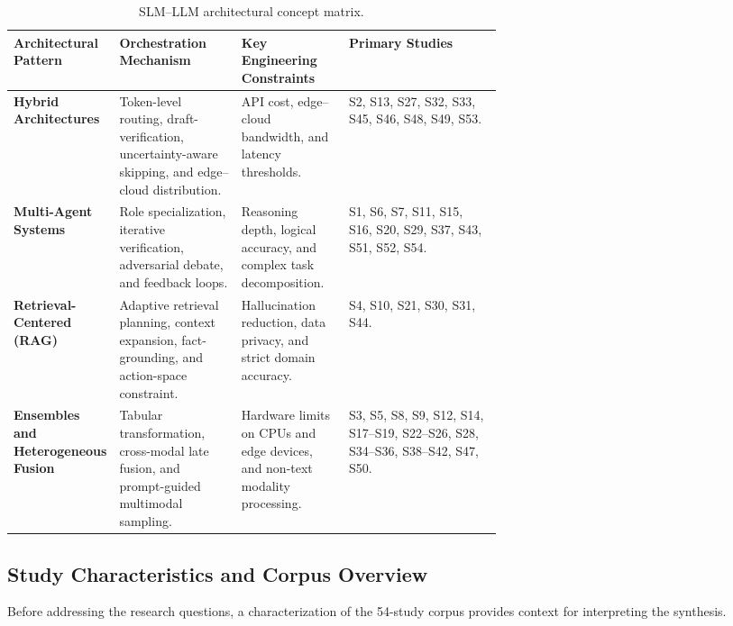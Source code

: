 \begin{table}[!htbp]
\centering
\caption{SLM--LLM architectural concept matrix.}
\label{tab:concept-matrix}
\footnotesize
\setlength{\tabcolsep}{3pt}
\renewcommand{\arraystretch}{1.08}
\begin{tabularx}{\linewidth}{
  @{}
  >{\raggedright\arraybackslash}p{0.16\linewidth}
  >{\raggedright\arraybackslash}p{0.25\linewidth}
  >{\raggedright\arraybackslash}p{0.22\linewidth}
  >{\raggedright\arraybackslash}X
  @{}
}
\toprule
\textbf{Architectural Pattern} &
\textbf{Orchestration Mechanism} &
\textbf{Key Engineering Constraints} &
\textbf{Primary Studies} \\
\midrule
\textbf{Hybrid Architectures} &
Token-level routing, draft-verification, uncertainty-aware skipping, and edge--cloud distribution. &
API cost, edge--cloud bandwidth, and latency thresholds. &
S2, S13, S27, S32, S33, S45, S46, S48, S49, S53. \\

\textbf{Multi-Agent Systems} &
Role specialization, iterative verification, adversarial debate, and feedback loops. &
Reasoning depth, logical accuracy, and complex task decomposition. &
S1, S6, S7, S11, S15, S16, S20, S29, S37, S43, S51, S52, S54. \\

\textbf{Retrieval-Centered (RAG)} &
Adaptive retrieval planning, context expansion, fact-grounding, and action-space constraint. &
Hallucination reduction, data privacy, and strict domain accuracy. &
S4, S10, S21, S30, S31, S44. \\

\textbf{Ensembles and Heterogeneous Fusion} &
Tabular transformation, cross-modal late fusion, and prompt-guided multimodal sampling. &
Hardware limits on CPUs and edge devices, and non-text modality processing. &
S3, S5, S8, S9, S12, S14, S17--S19, S22--S26, S28, S34--S36, S38--S42, S47, S50. \\
\bottomrule
\end{tabularx}
\end{table}

\subsection{Study Characteristics and Corpus Overview}
\label{sec:study_characteristics}

Before addressing the research questions, a characterization of the 54-study corpus provides context for interpreting the synthesis.

